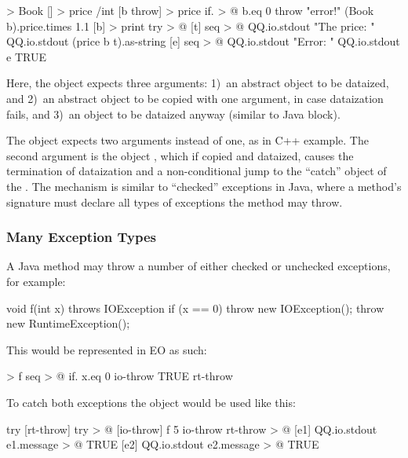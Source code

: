 \documentclass[sigplan,11pt,nonacm,natbib=false]{acmart}
\begin{document}
\begin{ffcode}
[] > Book
  [] > price /int
[b throw] > price
  if. > @
    b.eq 0
    throw "error!"
    (Book b).price.times 1.1
[b] > print
  try > @
    [t]
      seq > @
        QQ.io.stdout "The price: "
        QQ.io.stdout (price b t).as-string
    [e]
      seq > @
        QQ.io.stdout "Error: "
        QQ.io.stdout e
    TRUE
\end{ffcode}

Here, the object  expects three arguments: 1)~an abstract object to be dataized, and 2)~an abstract object to be copied with one argument, in case dataization fails, and 3)~an object to be dataized anyway (similar to Java  block). 

The object  expects two arguments instead of one, as in C++ example. The second argument is the object , which if copied and dataized, causes the termination of dataization and a non-conditional jump to the ``catch'' object of the . The mechanism is similar to ``checked'' exceptions in Java, where a method's signature must declare all types of exceptions the method may throw.

\subsubsection{Many Exception Types}

A Java method may throw a number of either checked or unchecked exceptions, for example:

\begin{ffcode}
void f(int x) throws IOException {
  if (x == 0) {
    throw new IOException();
  }
  throw new RuntimeException();
}
\end{ffcode}

This would be represented in EO as such:

\begin{ffcode}
 > f
  seq > @
    if.
      x.eq 0
      io-throw
      TRUE
    rt-throw
\end{ffcode}

To catch both exceptions the object  would be used like this:

\begin{ffcode}
try
  [rt-throw]
    try > @
      [io-throw]
        f 5 io-throw rt-throw > @
      [e1]
        QQ.io.stdout e1.message > @
      TRUE
  [e2]
    QQ.io.stdout e2.message > @
  TRUE
\end{ffcode}
\end{document}
